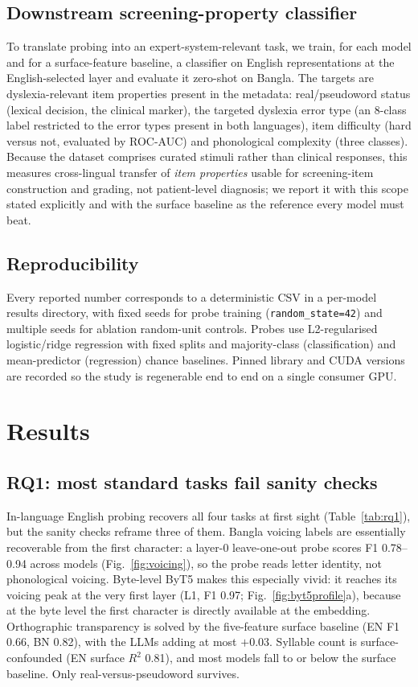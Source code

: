 \documentclass[preprint,12pt]{elsarticle}
\begin{document}
\subsection{Downstream screening-property classifier}
\label{sec:method-downstream}
To translate probing into an expert-system-relevant task, we train, for each model and for a surface-feature baseline, a classifier on English representations at the English-selected layer and evaluate it zero-shot on Bangla. The targets are dyslexia-relevant item properties present in the metadata: real/pseudoword status (lexical decision, the clinical marker), the targeted dyslexia error type (an 8-class label restricted to the error types present in both languages), item difficulty (hard versus not, evaluated by ROC-AUC) and phonological complexity (three classes). Because the dataset comprises curated stimuli rather than clinical responses, this measures cross-lingual transfer of \emph{item properties} usable for screening-item construction and grading, not patient-level diagnosis; we report it with this scope stated explicitly and with the surface baseline as the reference every model must beat.

\subsection{Reproducibility}
Every reported number corresponds to a deterministic CSV in a per-model results directory, with fixed seeds for probe training (\texttt{random\_state=42}) and multiple seeds for ablation random-unit controls. Probes use L2-regularised logistic/ridge regression with fixed splits and majority-class (classification) and mean-predictor (regression) chance baselines. Pinned library and CUDA versions are recorded so the study is regenerable end to end on a single consumer GPU.

\section{Results}
\label{sec:results}
\subsection{RQ1: most standard tasks fail sanity checks}
In-language English probing recovers all four tasks at first sight (Table~\ref{tab:rq1}), but the sanity checks reframe three of them. Bangla voicing labels are essentially recoverable from the first character: a layer-0 leave-one-out probe scores F1 0.78--0.94 across models (Fig.~\ref{fig:voicing}), so the probe reads letter identity, not phonological voicing. Byte-level ByT5 makes this especially vivid: it reaches its voicing peak at the very first layer (L1, F1 0.97; Fig.~\ref{fig:byt5profile}a), because at the byte level the first character is directly available at the embedding. Orthographic transparency is solved by the five-feature surface baseline (EN F1 0.66, BN 0.82), with the LLMs adding at most $+0.03$. Syllable count is surface-confounded (EN surface $R^2$ 0.81), and most models fall to or below the surface baseline. Only real-versus-pseudoword survives.
\end{document}
